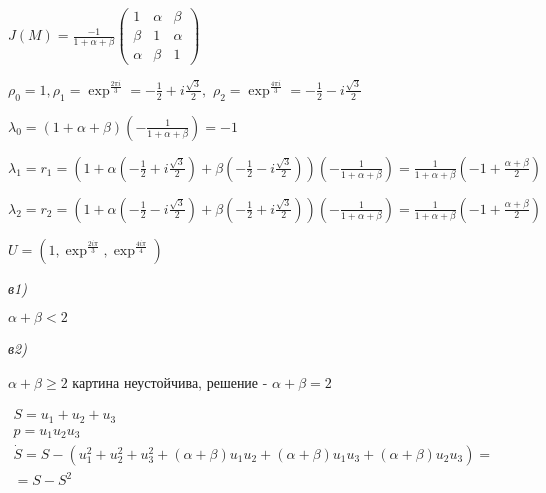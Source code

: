 \documentclass{article}
\begin{document}
\vspace{0.5cm}
\begin{large}
\(
J(M) 
=\frac{-1}{1+\alpha+\beta}
	\begin{pmatrix}
		1 & \alpha & \beta\\
		\beta & 1 & \alpha\\
		\alpha & \beta & 1
	\end{pmatrix}
\)


\vspace{0.5cm}
\(
	\rho_0 = 1, \rho_1 = \exp^{\frac{2\pi i}{3}} = -\frac{1}{2}+i\frac{\sqrt{3}}{2},
\)\hspace{0.1cm}
\(
	\rho_2 = \exp^\frac{4\pi i}{3} = -\frac{1}{2} - i\frac{\sqrt{3}}{2}
\)

\vspace{0.5cm}
\(
\lambda_0 = (1 + \alpha + \beta)(-\frac{1}{1 + \alpha + \beta}) = -1
\)

\vspace{0.5cm}
\(
\lambda_1=r_1 = (1 + \alpha( -\frac{1}{2}+i\frac{\sqrt{3}}{2}) + \beta( -\frac{1}{2} - i\frac{\sqrt{3}}{2}))(-\frac{1}{1 + \alpha + \beta}) = \frac{1}{1 + \alpha + \beta}(-1+\frac{\alpha+\beta}{2})
\)

\vspace{0.5cm}
\(
\lambda_2 = r_2 = (1 + \alpha( -\frac{1}{2} - i\frac{\sqrt{3}}{2}) + \beta( -\frac{1}{2} + i\frac{\sqrt{3}}{2}))(-\frac{1}{1 + \alpha + \beta})=\frac{1}{1 + \alpha + \beta}(-1+\frac{\alpha+\beta}{2})
\)

\vspace{0.5cm}
\(
U = (1, \exp^\frac{2i\pi}{3}, \exp^\frac{4i\pi}{4})
\)

\vspace{0.5cm}
\textit{в1)}

\(
\alpha + \beta < 2
\)

\vspace{0.5cm}
\textit{в2)}

\(
\alpha + \beta \geq 2
\)
\hspace{0.1cm} картина неустойчива, решение - \(\alpha + \beta = 2\)

\vspace{0.5cm}
\(
	\begin{matrix}
		S = u_1 + u_2 + u_3\\
		p = u_1u_2u_3
	\end{matrix}
\)\hspace{1cm}
\(
\begin{matrix}
	\dot{S} = S - (u_1^2 + u_2^2 + u_3^2 +(\alpha + \beta)u_1u_2 + (\alpha + \beta)u_1u_3 + (\alpha + \beta)u_2u_3) =\\ 
		= S - S^2
\end{matrix}
\)


\end{large}
\end{document}
